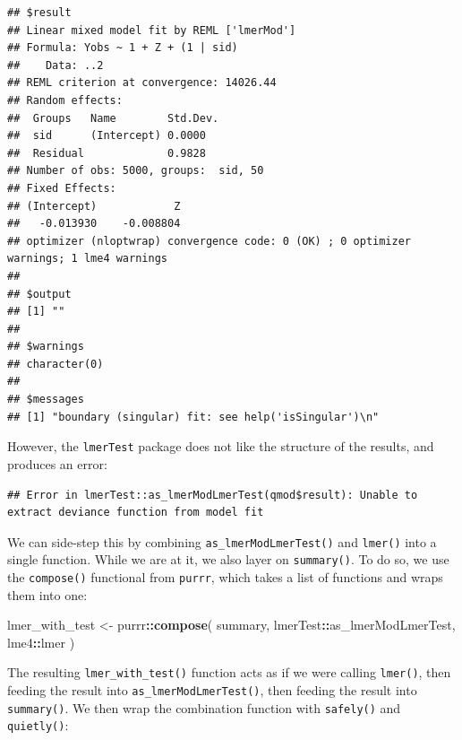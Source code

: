 \documentclass[
]{book}
\newenvironment{Shaded}{\begin{snugshade}}{\end{snugshade}}
\newcommand{\FunctionTok}[1]{\textcolor[rgb]{0.13,0.29,0.53}{\textbf{#1}}}
\newcommand{\NormalTok}[1]{#1}
\newcommand{\OtherTok}[1]{\textcolor[rgb]{0.56,0.35,0.01}{#1}}
\newcommand{\SpecialCharTok}[1]{\textcolor[rgb]{0.81,0.36,0.00}{\textbf{#1}}}
\begin{document}
\begin{verbatim}
## $result
## Linear mixed model fit by REML ['lmerMod']
## Formula: Yobs ~ 1 + Z + (1 | sid)
##    Data: ..2
## REML criterion at convergence: 14026.44
## Random effects:
##  Groups   Name        Std.Dev.
##  sid      (Intercept) 0.0000  
##  Residual             0.9828  
## Number of obs: 5000, groups:  sid, 50
## Fixed Effects:
## (Intercept)            Z  
##   -0.013930    -0.008804  
## optimizer (nloptwrap) convergence code: 0 (OK) ; 0 optimizer warnings; 1 lme4 warnings 
## 
## $output
## [1] ""
## 
## $warnings
## character(0)
## 
## $messages
## [1] "boundary (singular) fit: see help('isSingular')\n"
\end{verbatim}

However, the \texttt{lmerTest} package does not like the structure of the results, and produces an error:

\begin{Shaded}
\end{Shaded}

\begin{verbatim}
## Error in lmerTest::as_lmerModLmerTest(qmod$result): Unable to extract deviance function from model fit
\end{verbatim}

We can side-step this by combining \texttt{as\_lmerModLmerTest()} and \texttt{lmer()} into a single function.
While we are at it, we also layer on \texttt{summary()}.
To do so, we use the \texttt{compose()} functional from \texttt{purrr}, which takes a list of functions and wraps them into one:

\begin{Shaded}
\begin{Highlighting}[]
\NormalTok{lmer\_with\_test }\OtherTok{\textless{}{-}}\NormalTok{ purrr}\SpecialCharTok{::}\FunctionTok{compose}\NormalTok{(}
\NormalTok{  summary,}
\NormalTok{  lmerTest}\SpecialCharTok{::}\NormalTok{as\_lmerModLmerTest, }
\NormalTok{  lme4}\SpecialCharTok{::}\NormalTok{lmer}
\NormalTok{)}
\end{Highlighting}
\end{Shaded}

The resulting \texttt{lmer\_with\_test()} function acts as if we were calling \texttt{lmer()}, then feeding the result into \texttt{as\_lmerModLmerTest()}, then feeding the result into \texttt{summary()}.
We then wrap the combination function with \texttt{safely()} and \texttt{quietly()}:
\end{document}
